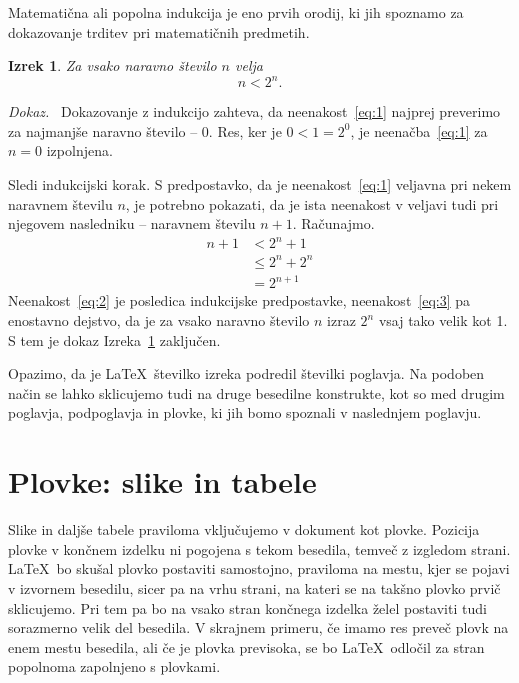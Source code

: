 \documentclass[a4paper, 12pt]{book}
\newtheorem{izrek}{Izrek}[chapter]
\newenvironment{dokaz}{\emph{Dokaz.}\ }{\hspace{\fill}{$\Box$}}
\begin{document}
Matematična ali popolna indukcija je eno prvih orodij, ki jih spoznamo za dokazovanje trditev pri matematičnih predmetih.
\begin{izrek}
\label{iz:1}
Za vsako naravno število $n$ velja
\begin{equation}
n < 2^n.
\label{eq:1}
\end{equation}
\end{izrek}
\begin{dokaz}
Dokazovanje z indukcijo zahteva, da neenakost~\eqref{eq:1} najprej preverimo za najmanjše naravno število -- $0$. 
Res, ker je $0 < 1 = 2^0$, je neenačba~\eqref{eq:1} za $n=0$ izpolnjena.

Sledi indukcijski korak. S predpostavko, da je neenakost~\eqref{eq:1} veljavna pri nekem naravnem številu $n$, je potrebno pokazati, da je ista neenakost v veljavi tudi pri njegovem nasledniku -- naravnem številu $n+1$. 
Računajmo.
\begin{align}
n+1 & < 2^n + 1       \label{eq:2}\\
       & \le 2^n + 2^n \label{eq:3}\\
       & = 2^{n+1}       \nonumber
\end{align}
Neenakost~\eqref{eq:2} je posledica indukcijske predpostavke, neenakost~\eqref{eq:3} pa enostavno dejstvo, da je za vsako naravno število $n$ izraz $2^n$ vsaj tako velik kot 1. 
S tem je dokaz Izreka~\ref{iz:1} zaključen.
\end{dokaz}

Opazimo, da je \LaTeX\ številko izreka podredil številki poglavja.
Na podoben način se lahko sklicujemo tudi na druge besedilne konstrukte, kot so med drugim poglavja, podpoglavja in plovke, ki jih bomo spoznali v naslednjem poglavju.


\chapter{Plovke: slike in tabele}
\label{ch2}

Slike in daljše tabele praviloma vključujemo v dokument kot plovke. 
Pozicija plovke v končnem izdelku ni pogojena s tekom besedila, temveč z izgledom strani. 
\LaTeX\ bo skušal plovko postaviti samostojno, praviloma na mestu, kjer se pojavi v izvornem besedilu, sicer pa na 
vrhu strani, na kateri se na takšno plovko prvič sklicujemo. 
Pri tem pa bo na vsako stran končnega izdelka želel postaviti tudi sorazmerno velik del besedila. 
V skrajnem primeru, če imamo res preveč plovk na enem mestu besedila, ali če je plovka previsoka, se bo \LaTeX\ odločil za stran popolnoma zapolnjeno s plovkami.
\end{document}

